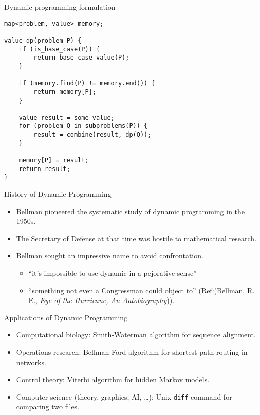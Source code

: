    \begin{frame}[fragile]{Dynamic programming formulation}
    \begin{lstlisting}
map<problem, value> memory;

value dp(problem P) {
    if (is_base_case(P)) {
        return base_case_value(P);
    }

    if (memory.find(P) != memory.end()) {
        return memory[P];
    }

    value result = some value;
    for (problem Q in subproblems(P)) {
        result = combine(result, dp(Q));
    }

    memory[P] = result;
    return result;
}
    \end{lstlisting}
\end{frame}


   \begin{frame}[fragile]{History of Dynamic Programming}

  \begin{itemize}
  \item Bellman pioneered the systematic study of dynamic programming in
    the 1950s.  

  \item The Secretary of Defense at that time was hostile to mathematical research.
  \item Bellman sought an impressive name to avoid confrontation. 
    \begin{itemize}
    \item ``it's impossible to use dynamic in a pejorative sense''
    \item ``something not even a Congressman could object to''
      (Ref:{(Bellman, R. E., \emph{Eye of the Hurricane, An
        Autobiography})}).
    \end{itemize} 
  \end{itemize}
\end{frame}

   \begin{frame}[fragile]{Applications of Dynamic Programming}

  \begin{itemize}
  \item Computational biology: Smith-Waterman algorithm for sequence alignment.
  \item Operations research: Bellman-Ford algorithm for shortest path
    routing in networks.
  \item Control theory: Viterbi algorithm for hidden Markov models.
  \item Computer science (theory, graphics, AI, \ldots): Unix
    \texttt{diff} command for comparing two files.
  \end{itemize}
\end{frame}



